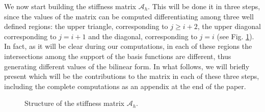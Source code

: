 We now start building the stiffness matrix $\mathcal A_h$. This will be done it in three steps, since the values of the matrix can be computed differentiating among three well defined regions: the upper triangle, corresponding to $j\geq i+2$, the upper diagonal corresponding to $j=i+1$ and the diagonal, corresponding to $j=i$ (see Fig. \ref{matrix_fig}). In fact, as it will be clear during our computations, in each of these regions the intersections among the support of the basis functions are different, thus generating different values of the bilinear form. In what follows, we will briefly present which will be the contributions to the matrix in each of these three steps, including the complete computations as an appendix at the end of the paper. 

\begin{figure}[!h]
\centering
{}
\caption{Structure of the stiffness matrix $\mathcal{A}_h$.}\label{matrix_fig}
\end{figure}

